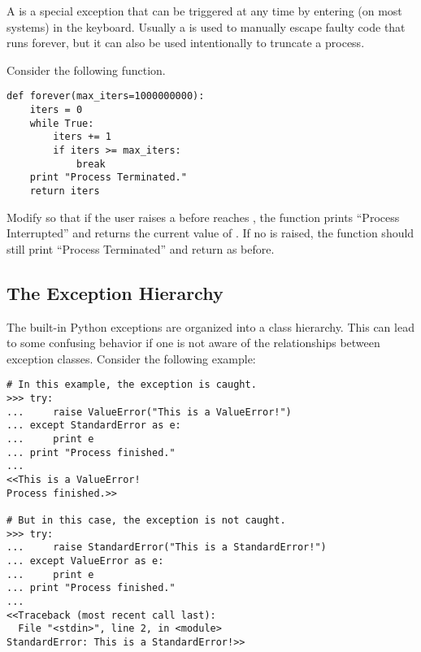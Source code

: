 \begin{problem}
A  is a special exception that can be triggered at any time by entering  (on most systems) in the keyboard.
Usually a  is used to manually escape faulty code that runs forever, but it can also be used intentionally to truncate a process.

Consider the following function.

\begin{lstlisting}
def forever(max_iters=1000000000):
    iters = 0
    while True:
        iters += 1
        if iters >= max_iters:
            break
    print "Process Terminated."
    return iters
\end{lstlisting}
Modify  so that if the user raises a  before  reaches , the function prints ``Process Interrupted'' and returns the current value of .
If no  is raised, the function should still print ``Process Terminated'' and return  as before.
\end{problem}

\begin{comment}
\subsection*{Chaining Exceptions}
\begin{lstlisting}
>>> try:
>>>     raise ValueError("First Exception")
>>> except ValueError as e:
>>>     raise ZeroDivisionError("Second Exception") from e
\end{lstlisting}
\end{comment}

\subsection*{The Exception Hierarchy}

The built-in Python exceptions are organized into a class hierarchy.
This can lead to some confusing behavior if one is not aware of the relationships between exception classes.
Consider the following example:

\begin{lstlisting}
# In this example, the exception is caught.
>>> try:
...     raise ValueError("This is a ValueError!")
... except StandardError as e:
...     print e
... print "Process finished."
...
<<This is a ValueError!
Process finished.>>

# But in this case, the exception is not caught.
>>> try:
...     raise StandardError("This is a StandardError!")
... except ValueError as e:
...     print e
... print "Process finished."
...
<<Traceback (most recent call last):
  File "<stdin>", line 2, in <module>
StandardError: This is a StandardError!>>
\end{lstlisting}

